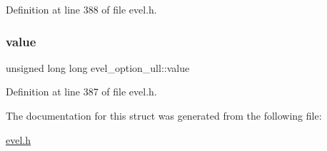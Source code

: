 Definition at line 388 of file evel.\+h.

\hypertarget{structevel__option__ull_a124affbc97975bbf896e9801fed819d6}{}\label{structevel__option__ull_a124affbc97975bbf896e9801fed819d6} 
\subsubsection{\texorpdfstring{value}{value}}
{\footnotesize\ttfamily unsigned long long evel\+\_\+option\+\_\+ull\+::value}



Definition at line 387 of file evel.\+h.



The documentation for this struct was generated from the following file\+:\begin{DoxyCompactItemize}
\item 
\hyperlink{evel_8h}{evel.\+h}\end{DoxyCompactItemize}
